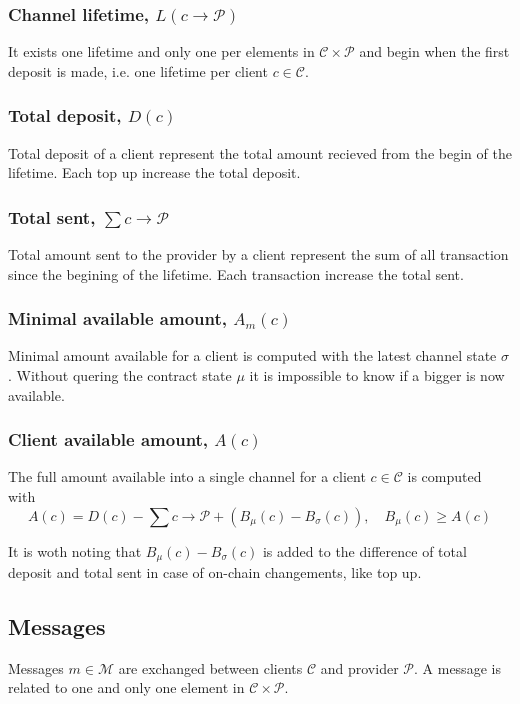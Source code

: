 \documentclass{llncs}
\begin{document}
\subsubsection{Channel lifetime, $L(c \rightarrow \mathcal{P})$} It exists one lifetime and only one per elements in $\mathcal{C} \times \mathcal{P}$ and begin when the first deposit is made, i.e. one lifetime per client $c \in \mathcal{C}$.

\subsubsection{Total deposit, $D(c)$} Total deposit of a client represent the total amount recieved from the begin of the lifetime. Each top up increase the total deposit.

\subsubsection{Total sent, $\sum c \rightarrow \mathcal{P}$} Total amount sent to the provider by a client represent the sum of all transaction since the begining of the lifetime. Each transaction increase the total sent.

\subsubsection{Minimal available amount, $A_m(c)$} Minimal amount available for a client is computed with the latest channel state $\sigma$. Without quering the contract state $\mu$ it is impossible to know if a bigger is now available.

\subsubsection{Client available amount, $A(c)$} The full amount available into a single channel for a client $c \in \mathcal{C}$ is computed with
$$A(c) = D(c) - \textstyle \sum c \rightarrow \mathcal{P} + (B_\mu(c) - B_\sigma(c)), \quad B_\mu(c) \geq A(c)$$

It is woth noting that $B_\mu(c) - B_\sigma(c)$ is added to the difference of total deposit and total sent in case of on-chain changements, like top up.

\subsection{Messages} Messages $m \in \mathcal{M}$ are exchanged between clients $\mathcal{C}$ and provider $\mathcal{P}$. A message is related to one and only one element in $\mathcal{C} \times \mathcal{P}$.
\end{document}
